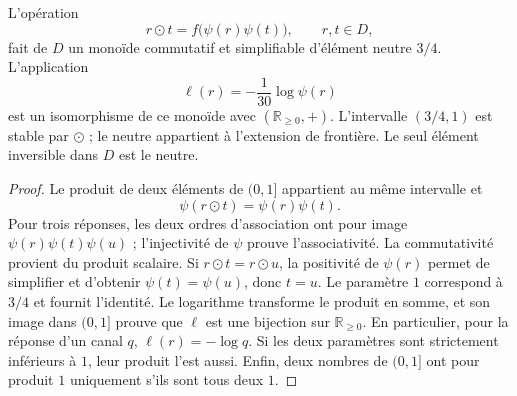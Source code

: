 \begin{proposition}
\label{amp-comp-monoid}
L’opération
\begin{equation}
 r\odot t=f\bigl(\psi(r)\psi(t)\bigr),\qquad r,t\in D,
 \label{amp-comp-law}
\end{equation}
fait de $D$ un monoïde commutatif et simplifiable d’élément neutre $3/4$.
L’application
\begin{equation}
 \ell(r)=-\frac1{30}\log\psi(r)
 \label{amp-comp-character}
\end{equation}
est un isomorphisme de ce monoïde avec $(\mathbb R_{\geq0},+)$.
L’intervalle $(3/4,1)$ est stable par $\odot$ ; le neutre appartient à
l’extension de frontière. Le seul élément inversible dans $D$
est le neutre.
\end{proposition}
\begin{proof}
Le produit de deux éléments de $(0,1]$ appartient au même intervalle et
\[
 \psi(r\odot t)=\psi(r)\psi(t).
\]
Pour trois réponses, les deux ordres d’association ont pour image
$\psi(r)\psi(t)\psi(u)$ ; l’injectivité de $\psi$ prouve
l’associativité. La commutativité provient du produit scalaire. Si
$r\odot t=r\odot u$, la positivité de $\psi(r)$ permet de simplifier et
d’obtenir $\psi(t)=\psi(u)$, donc $t=u$. Le paramètre $1$ correspond à
$3/4$ et fournit l’identité. Le logarithme transforme le produit en
somme, et son image dans $(0,1]$ prouve que $\ell$ est une bijection sur
$\mathbb R_{\geq0}$. En particulier, pour la réponse d’un canal $q$,
$\ell(r)=-\log q$. Si les deux paramètres sont strictement inférieurs à
$1$, leur produit l’est aussi. Enfin, deux nombres de $(0,1]$
ont pour produit $1$ uniquement s’ils sont tous deux $1$.
\end{proof}

